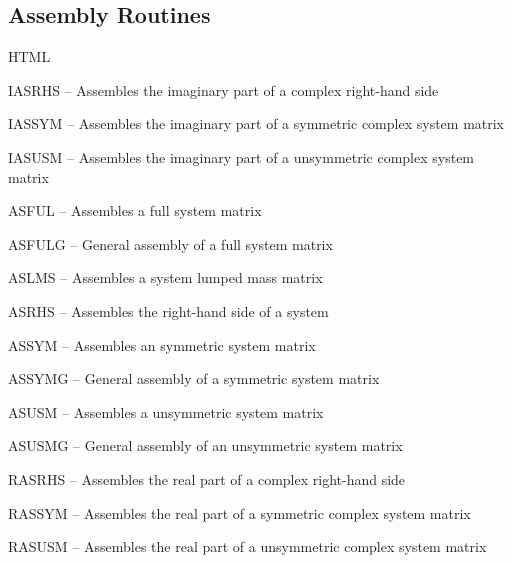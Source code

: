 \subsection*{Assembly Routines}   HTML%
\begin{list}{}{\leftmargin=57pt }
\item[IASRHS \hfill] -- Assembles the imaginary part of a complex right-hand side
\item[IASSYM \hfill] -- Assembles the imaginary part of a symmetric complex system matrix
\item[IASUSM \hfill] -- Assembles the imaginary part of a unsymmetric complex system matrix
\item[ASFUL \hfill]  -- Assembles a full system matrix
\item[ASFULG \hfill] -- General assembly of a full system matrix
\item[ASLMS \hfill]  -- Assembles a system lumped mass matrix
\item[ASRHS \hfill]  -- Assembles the right-hand side of a system
\item[ASSYM \hfill]  -- Assembles an symmetric system matrix
\item[ASSYMG \hfill] -- General assembly of a symmetric system matrix
\item[ASUSM \hfill]  -- Assembles a unsymmetric system matrix
\item[ASUSMG \hfill] -- General assembly of an unsymmetric system matrix
\item[RASRHS \hfill] -- Assembles the real part of a complex right-hand side
\item[RASSYM \hfill] -- Assembles the real part of a symmetric complex system matrix
\item[RASUSM \hfill] -- Assembles the real part of a unsymmetric complex system matrix
\end{list}

